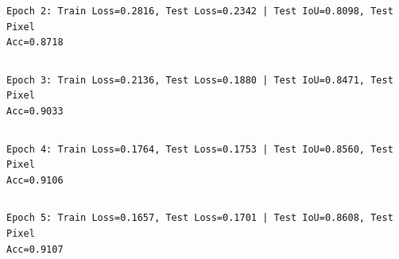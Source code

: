 \documentclass[11pt]{article}
\begin{document}
    \begin{Verbatim}[commandchars=\\\{\}]
Epoch 2: Train Loss=0.2816, Test Loss=0.2342 | Test IoU=0.8098, Test Pixel
Acc=0.8718
    \end{Verbatim}

    \begin{Verbatim}[commandchars=\\\{\}]

    \end{Verbatim}

    \begin{Verbatim}[commandchars=\\\{\}]
Epoch 3: Train Loss=0.2136, Test Loss=0.1880 | Test IoU=0.8471, Test Pixel
Acc=0.9033
    \end{Verbatim}

    \begin{Verbatim}[commandchars=\\\{\}]

    \end{Verbatim}

    \begin{Verbatim}[commandchars=\\\{\}]
Epoch 4: Train Loss=0.1764, Test Loss=0.1753 | Test IoU=0.8560, Test Pixel
Acc=0.9106
    \end{Verbatim}

    \begin{Verbatim}[commandchars=\\\{\}]

    \end{Verbatim}

    \begin{Verbatim}[commandchars=\\\{\}]
Epoch 5: Train Loss=0.1657, Test Loss=0.1701 | Test IoU=0.8608, Test Pixel
Acc=0.9107
    \end{Verbatim}

    \begin{Verbatim}[commandchars=\\\{\}]

    \end{Verbatim}
\end{document}
